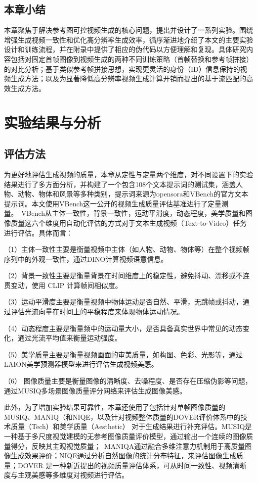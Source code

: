 \subsection{本章小结}
本章聚焦于解决参考图可控视频生成的核心问题，提出并设计了一系列实验。围绕增强生成视频一致性和优化高分辨率生成效率，循序渐进地介绍了本文的主要实验设计和训练流程，并在附录中提供了相应的伪代码以方便理解和复现。具体研究内容包括对固定首帧图像到视频生成的两种不同训练策略（首帧替换和参考帧拼接）的对比分析；基于类似参考帧拼接思想，实现更灵活的身份（ID）信息保持的视频生成方法；以及为显著降低高分辨率视频生成计算开销而提出的基于流匹配的高效生成方法。

\cleardoublepage

\section{实验结果与分析}
\subsection{评估方法}

为更好地评估生成视频的质量，本章从定性与定量两个维度，对不同设置下的实验结果进行了多方面分析，并构建了一个包含108个文本提示词的测试集，涵盖人物、动物、物体和风景等多种类别，提示词来源为opensora和VBench的官方文本提示词。本文使用VBench这一公开的视频生成质量评估基准进行了定量测量。\
VBench从主体一致性，背景一致性，运动平滑度，动态程度，美学质量和图像质量这六个维度用自动化评估的方式对于文本生成视频（Text-to-Video）任务进行评估。具体而言：

（1）主体一致性主要是衡量视频中主体（如人物、动物、物体等）在整个视频帧序列中的外观一致性，通过DINO计算视频语意信息。

（2）背景一致性主要是衡量背景在时间维度上的稳定性，避免抖动、漂移或不连贯变动，使用 CLIP 计算帧间相似度。

（3）运动平滑度主要是衡量视频中物体运动是否自然、平滑，无跳帧或抖动，通过评估光流向量在时间上的平稳程度来体现物体运动情况。

（4）动态程度主要是衡量频中的运动量大小，是否具备真实世界中常见的动态变化，通过光流平均值来衡量运动强度。

（5）美学质量主要是衡量视频画面的审美质量，如构图、色彩、光影等，通过LAION美学预测器模型来进行评估生成视频美感。

（6） 图像质量主要是衡量图像的清晰度、去噪程度、是否存在压缩伪影等问题，通过MUSIQ多场景图像质量评分网络来评估生成图像美感。

此外，为了增加实验结果可靠性，本章还使用了包括针对单帧图像质量的MUSIQ\cite{ke2021musiq}、MANIQ\cite{maniqa}（和NIQE\cite{niqe}，以及针对视频整体质量的DOVER\cite{dover}评价体系中的技术质量（Tech）和美学质量（Aesthetic）
对于生成结果进行补充评估。MUSIQ是一种基于多尺度视觉建模的无参考图像质量评价模型，通过输出一个连续的图像质量得分，反映其主观视觉质量；\
MANIQA通过融合多维注意力机制用于高质量图像生成效果评价；NIQE通过分析自然图像的统计分布特征，来评估图像生成质量；DOVER 是一种新近提出的视频质量评估体系，可从时间一致性、视频清晰度与主观美感等多维度对视频进行评估。

